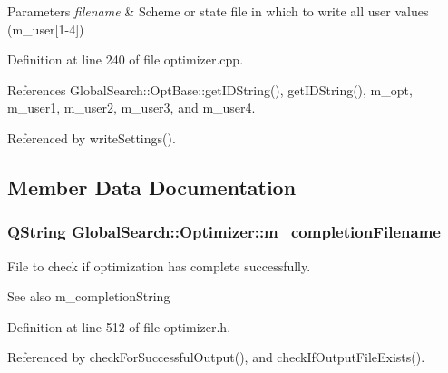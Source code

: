 \begin{DoxyParams}{Parameters}
{\em filename} & Scheme or state file in which to write all user values (m\+\_\+user\mbox{[}1-\/4\mbox{]}) \\
\hline
\end{DoxyParams}


Definition at line 240 of file optimizer.\+cpp.



References Global\+Search\+::\+Opt\+Base\+::get\+I\+D\+String(), get\+I\+D\+String(), m\+\_\+opt, m\+\_\+user1, m\+\_\+user2, m\+\_\+user3, and m\+\_\+user4.



Referenced by write\+Settings().



\subsection{Member Data Documentation}
\hypertarget{classGlobalSearch_1_1Optimizer_a5e7a476823bc2d4b63939a9ada4f8ed0}{}
\subsubsection[{m\+\_\+completion\+Filename}]{\setlength{\rightskip}{0pt plus 5cm}Q\+String Global\+Search\+::\+Optimizer\+::m\+\_\+completion\+Filename\hspace{0.3cm}{\ttfamily [protected]}}\label{classGlobalSearch_1_1Optimizer_a5e7a476823bc2d4b63939a9ada4f8ed0}
File to check if optimization has complete successfully. \begin{DoxySeeAlso}{See also}
m\+\_\+completion\+String 
\end{DoxySeeAlso}


Definition at line 512 of file optimizer.\+h.



Referenced by check\+For\+Successful\+Output(), and check\+If\+Output\+File\+Exists().

\hypertarget{classGlobalSearch_1_1Optimizer_a65ee33ee8778c366e8b197e75ae8e674}{}
